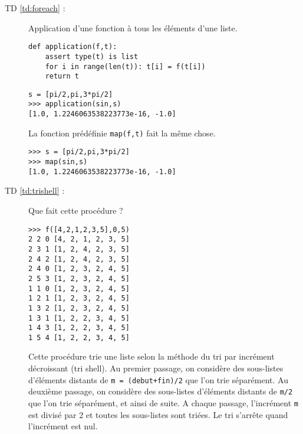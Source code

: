 \begin{description}
\begin{enumerate}
\end{enumerate}

\item[TD \ref{td:foreach} :] Application d'une fonction à tous les éléments d'une liste.

\begin{py}{6cm}
\begin{verbatim}
def application(f,t):
    assert type(t) is list
    for i in range(len(t)): t[i] = f(t[i])
    return t
\end{verbatim}
\end{py}
\hfill
\begin{py}{6cm}
\begin{verbatim}
s = [pi/2,pi,3*pi/2]
>>> application(sin,s)
[1.0, 1.2246063538223773e-16, -1.0]
\end{verbatim}
La fonction prédéfinie {\tt map(f,t)} fait la même chose.
\begin{verbatim}
>>> s = [pi/2,pi,3*pi/2]
>>> map(sin,s)
[1.0, 1.2246063538223773e-16, -1.0]
\end{verbatim}
\end{py}
\vspace*{2mm}

\item[TD \ref{td:trishell} :] Que fait cette procédure ? 

\begin{py}{4cm}
\begin{verbatim}
>>> f([4,2,1,2,3,5],0,5)
2 2 0 [4, 2, 1, 2, 3, 5]
2 3 1 [1, 2, 4, 2, 3, 5]
2 4 2 [1, 2, 4, 2, 3, 5]
2 4 0 [1, 2, 3, 2, 4, 5]
2 5 3 [1, 2, 3, 2, 4, 5]
1 1 0 [1, 2, 3, 2, 4, 5]
1 2 1 [1, 2, 3, 2, 4, 5]
1 3 2 [1, 2, 3, 2, 4, 5]
1 3 1 [1, 2, 2, 3, 4, 5]
1 4 3 [1, 2, 2, 3, 4, 5]
1 5 4 [1, 2, 2, 3, 4, 5]
\end{verbatim}
\end{py}
\hfill
\begin{minipage}[t]{9cm}
Cette procédure trie une liste selon la méthode du tri par incrément décroissant (tri shell).
Au premier passage, on considère des sous-listes d'éléments distants de {\tt m = (debut+fin)/2}
que l'on trie séparément. Au deuxième passage, on considère des sous-listes d'éléments distants 
de {\tt m/2} que l'on trie séparément, et ainsi de suite. A chaque passage, l'incrément {\tt m} est
divisé par 2 et toutes les sous-listes sont triées. Le tri s'arrête quand l'incrément est nul.
\end{minipage}
\vspace*{2mm}


\end{description}
